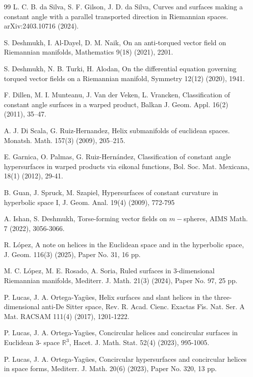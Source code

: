 \documentclass[12pt]{amsart}
\def\r{\mathbb R}
\theoremstyle{definition}
\begin{document}
\begin{thebibliography}{99}
 L. C. B. da Silva, S. F. Gilson, J. D. da Silva, Curves and surfaces making a constant angle with a parallel transported direction in Riemannian spaces. arXiv:2403.10716 (2024).

 S. Deshmukh, I. Al-Dayel, D. M. Naik, On an anti-torqued vector field on Riemannian manifolds, Mathematics 9(18) (2021), 2201.

 S. Deshmukh, N. B. Turki, H. Alodan, On the differential equation governing torqued vector fields on a Riemannian manifold, Symmetry 12(12) (2020), 1941.

 F. Dillen, M. I. Munteanu, J. Van der Veken, L. Vrancken, Classification of constant angle surfaces in a warped product, Balkan J. Geom. Appl. 16(2) (2011), 35–47.

 A. J. Di Scala, G. Ruiz-Hernandez, Helix submanifolds of euclidean spaces. Monatsh. Math. 157(3) (2009), 205–215.

 E. Garnica, O. Palmas, G. Ruiz-Hernández, Classification of constant angle hypersurfaces in warped products via eikonal functions, Bol. Soc. Mat. Mexicana, 18(1) (2012), 29-41.

 B. Guan, J. Spruck, M. Szapiel, Hypersurfaces of constant curvature in hyperbolic space I, J. Geom. Anal. 19(4) (2009), 772-795

  A. Ishan, S. Deshmukh, Torse-forming vector fields on $m-$spheres, AIMS Math. 7 (2022), 3056-3066.

 R. L\'opez, A note on helices in the Euclidean space and in the hyperbolic space, J. Geom. 116(3) (2025), Paper No. 31, 16 pp.

 M. C. L\'opez, M. E. Rosado, A. Soria, Ruled surfaces in 3-dimensional Riemannian manifolds, Mediterr. J. Math. 21(3) (2024), Paper No. 97, 25 pp.

 P. Lucas, J. A. Ortega-Yag\"ues, Helix surfaces and slant helices in the three-dimensional anti-De Sitter space, Rev. R. Acad. Cienc. Exactas F\'{\i}s. Nat. Ser. A Mat. RACSAM 111(4) (2017), 1201-1222.

 P. Lucas, J. A. Ortega-Yag\"ues, Concircular helices and concircular surfaces in Euclidean 3-
space $\r^3$, Hacet. J. Math. Stat. 52(4) (2023), 995-1005.

 P. Lucas, J. A. Ortega-Yag\"ues, Concircular hypersurfaces and concircular helices in space forms, Mediterr. J. Math. 20(6) (2023), Paper No. 320, 13 pp.


\end{thebibliography}
\end{document}
